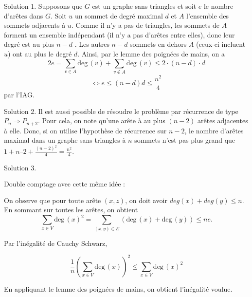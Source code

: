 \begin{sol}

Solution 1. Supposons que $G$ est un graphe sans triangles et soit $e$ le nombre d’arêtes dans $G$. Soit $u$ un sommet de degré maximal $d$ et $A$ l'ensemble des sommets adjacents à
$u$. Comme il n'y a pas de triangles, les sommets de $A$ forment un ensemble indépendant (il
n'y a pas d'arêtes entre elles), donc leur degré est au plus $n-d$ . Les autres $n-d$ sommets
en dehors $A$ (ceux-ci incluent $ u$) ont au plus le degré $d$. Ainsi, par le lemme des poignées de mains,
on a
$$ 2e = \sum_{v \in A} \mathrm{deg}\, (v) + \sum_{v \notin A} \mathrm{deg}\, (v)\leq 2\cdot (n-d) \cdot d $$
$$ \Leftrightarrow e \leq (n-d)d \leq \frac{n^2}{4}$$
 par l’IAG.



Solution 2.
Il est aussi possible de résoudre le problème par récurrence de type $P_n \Rightarrow P_{n+2}$.
Pour cela, on note qu’une arête à au plus $(n-2)$ arêtes adjacentes à elle.
Donc, si on utilise l’hypothèse de récurrence sur $n-2$, le nombre d’arêtes maximal dans un graphe sans triangles à $n$ sommets n’est pas plus grand que $1+n – 2 + \frac{(n-2)^2}{4}= \frac{n^2}{4}$.


Solution 3.

Double comptage avec cette même idée :

On observe que pour toute arête $(x,z)$, on doit avoir $deg(x) + deg(y) \leq n$.
En sommant sur toutes les arêtes, on obtient
$$ \sum_{x \in V} \mathrm{deg}\,(x)^2 = \sum_{(x,y) \in E} (\mathrm{deg}\,(x) + \mathrm{deg}\,(y)) \leq ne.$$

Par l’inégalité de Cauchy Schwarz,

$$ \frac{1}{n} \left( \sum_{x \in V} \mathrm{deg}\,(x) \right) ^2 \leq \sum_{x \in V} \mathrm{deg}\,(x)^2$$

En appliquant le lemme des poignées de mains, on obtient l’inégalité voulue.\\

\end{sol}

